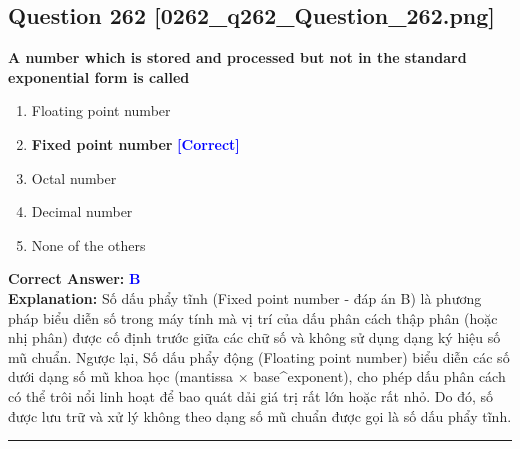 \documentclass[11pt,a4paper]{article}
\begin{document}
\begin{minipage}{\textwidth}
\subsection*{Question 262 \quad \footnotesize{[0262\_q262\_Question\_262.png]}}
\noindent \textbf{A number which is stored and processed but not in the standard exponential form is called}

\begin{enumerate}[label=\Alph*.]
    \item Floating point number
    \item \textbf{Fixed point number} \hfill \textcolor{blue}{\textbf{[Correct]}}
    \item Octal number
    \item Decimal number
    \item None of the others
\end{enumerate}

\noindent \textbf{Correct Answer:} \textcolor{blue}{\textbf{B}} \\[2pt]
\noindent \textbf{Explanation:} Số dấu phẩy tĩnh (Fixed point number - đáp án B) là phương pháp biểu diễn số trong máy tính mà vị trí của dấu phân cách thập phân (hoặc nhị phân) được cố định trước giữa các chữ số và không sử dụng dạng ký hiệu số mũ chuẩn. Ngược lại, Số dấu phẩy động (Floating point number) biểu diễn các số dưới dạng số mũ khoa học (mantissa × base\textasciicircum{}exponent), cho phép dấu phân cách có thể trôi nổi linh hoạt để bao quát dải giá trị rất lớn hoặc rất nhỏ. Do đó, số được lưu trữ và xử lý không theo dạng số mũ chuẩn được gọi là số dấu phẩy tĩnh.

\par\vspace{0.3cm}
\hrule
\vspace{0.3cm}
\end{minipage}
\end{document}
